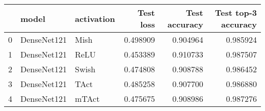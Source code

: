 \begin{tabular}{lllrrr}
\toprule
{} &        model & activation &  Test loss &  Test accuracy &  Test top-3 accuracy \\
\midrule
0 &  DenseNet121 &       Mish &   0.498909 &       0.904964 &             0.985924 \\
1 &  DenseNet121 &       ReLU &   0.453389 &       0.910733 &             0.987507 \\
2 &  DenseNet121 &      Swish &   0.474808 &       0.908788 &             0.986452 \\
3 &  DenseNet121 &       TAct &   0.485258 &       0.907700 &             0.986880 \\
4 &  DenseNet121 &      mTAct &   0.475675 &       0.908986 &             0.987276 \\
\bottomrule
\end{tabular}
